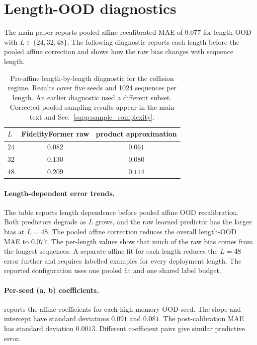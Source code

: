 \documentclass[10pt]{article}
\begin{document}
\section{Length-OOD diagnostics}
\label{supp:length_ood}

The main paper reports pooled affine-recalibrated MAE of $0.077$ for length OOD with $L\in\{24,32,48\}$. The following diagnostic reports each length before the pooled affine correction and shows how the raw bias changes with sequence length.

\begin{table}[h]
\centering
\caption{Pre-affine length-by-length diagnostic for the collision regime. Results cover five seeds and 1024 sequences per length. An earlier diagnostic used a different subset. Corrected pooled sampling results appear in the main text and Sec.~\ref{supp:sample_complexity}.}
\label{tab:supp_length_breakdown}
\begin{tabular}{lcc}
\toprule
$L$ & FidelityFormer raw & product approximation \\
\midrule
$24$ & $0.082$ & $0.061$ \\
$32$ & $0.130$ & $0.080$ \\
$48$ & $0.209$ & $0.114$ \\
\bottomrule
\end{tabular}
\end{table}

\paragraph*{Length-dependent error trends.}
The table reports length dependence before pooled affine OOD recalibration. Both predictors degrade as $L$ grows, and the raw learned predictor has the larger bias at $L=48$. The pooled affine correction reduces the overall length-OOD MAE to $0.077$. The per-length values show that much of the raw bias comes from the longest sequences. A separate affine fit for each length reduces the $L=48$ error further and requires labelled examples for every deployment length. The reported configuration uses one pooled fit and one shared label budget.

\paragraph*{Per-seed (a, b) coefficients.}
 reports the affine coefficients for each high-memory-OOD seed. The slope and intercept have standard deviations $0.091$ and $0.081$. The post-calibration MAE has standard deviation $0.0013$. Different coefficient pairs give similar predictive error.
\end{document}
